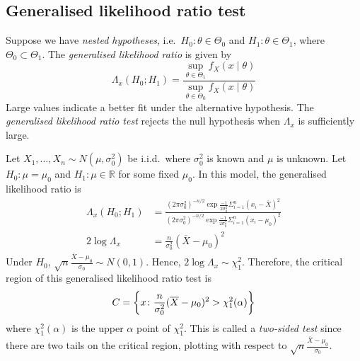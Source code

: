 \subsection{Generalised likelihood ratio test}
\begin{definition}
	Suppose we have \textit{nested hypotheses}, i.e.\ \( H_0 \colon \theta \in \Theta_0 \) and \( H_1 \colon \theta \in \Theta_1 \), where \( \Theta_0 \subset \Theta_1 \).
	The \textit{generalised likelihood ratio} is given by
	\[ \Lambda_x(H_0; H_1) = \frac{\sup_{\theta \in \Theta_1} f_X(x \mid \theta)}{\sup_{\theta \in \Theta_0} f_X(x \mid \theta)} \]
	Large values indicate a better fit under the alternative hypothesis.
	The \textit{generalised likelihood ratio test} rejects the null hypothesis when \( \Lambda_x \) is sufficiently large.
\end{definition}
\begin{example}
	Let \( X_1, \dots, X_n \sim N(\mu, \sigma_0^2) \) be i.i.d.\ where \( \sigma_0^2 \) is known and \( \mu \) is unknown.
	Let \( H_0 \colon \mu = \mu_0 \) and \( H_1 \colon \mu \in \mathbb R \) for some fixed \( \mu_0 \).
	In this model, the generalised likelihood ratio is
	\begin{align*}
		\Lambda_x(H_0; H_1) &= \frac{(2 \pi \sigma_0^2)^{-n/2} \exp{\frac{-1}{2\sigma_0^2} \Sigma_{i=1}^n (x_i - \overline X)^2}}{(2 \pi \sigma_0^2)^{-n/2} \exp{\frac{-1}{2\sigma_0^2} \Sigma_{i=1}^n (x_i - \mu_0)^2}} \\
		2\log \Lambda_x &= \frac{n}{\sigma_0^2}(\overline X - \mu_0)^2
	\end{align*}
	Under \( H_0 \), \( \sqrt{n} \frac{\overline X - \mu_0}{\sigma_0} \sim N(0,1) \).
	Hence, \( 2 \log \Lambda_x \sim \chi_1^2 \).
	Therefore, the critical region of this generalised likelihood ratio test is
	\[ C = \qty{x \colon \frac{n}{\sigma_0^2}(\overline X - \mu_0)^2 > \chi_1^2(\alpha)} \]
	where \( \chi_1^2(\alpha) \) is the upper \( \alpha \) point of \( \chi_1^2 \).
	This is called a \textit{two-sided test} since there are two tails on the critical region, plotting with respect to \( \sqrt{n} \frac{\overline X - \mu_0}{\sigma_0} \).
\end{example}

